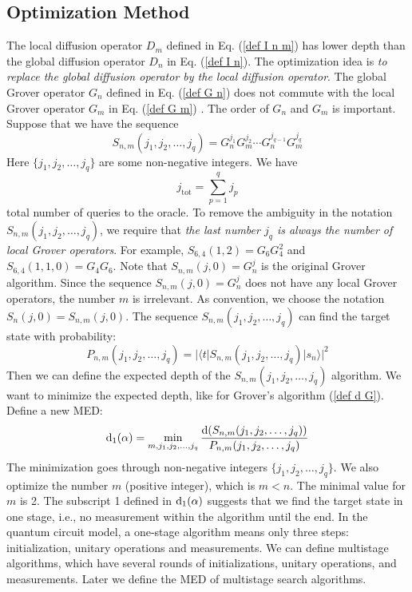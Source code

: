 \documentclass[%
 twocolumn,
 10pt,
 superscriptaddress,
 longbibliography,
 amsmath,amssymb,
 aps,
 pra,
floatfix,
]{revtex4-1}
\newcommand{\eq}{\begin{equation}}
\newcommand{\en}{\end{equation}}
\begin{document}
\subsection{\label{subsec: opt method} Optimization Method}

The local diffusion operator $D_m$ defined in Eq. (\ref{def I n m}) has lower depth than the global diffusion operator $D_n$ in Eq. (\ref{def I n}). The optimization idea is \textit{to replace the global diffusion operator by the local diffusion operator}. The global Grover operator $G_n$ defined in Eq. (\ref{def G n}) does not commute with the local Grover operator $G_m$ in Eq. (\ref{def G m}) \cite{KV06}. The order of $G_n$ and $G_m$ is important. Suppose that we have the sequence
\begin{equation}
	\label{def S n m}
	S_{n,m}(j_1,j_2,\ldots,j_q) = G_n^{j_1}G_m^{j_{2}}\cdots G_n^{j_{q-1}}G_m^{j_q}
\end{equation}
Here $\{j_1,j_2,\ldots,j_q\}$ are some non-negative integers. We have
\begin{equation}
	j_\text{tot} = \sum_{p=1}^q j_{p}
\end{equation}
total number of queries to the oracle. To remove the ambiguity in the notation $S_{n,m}(j_1,j_2,\ldots,j_q)$, we require that \textit{the last number $j_q$ is always the number of local Grover operators}. For example, $S_{6,4}(1,2) = G_6G^2_4$ and $S_{6,4}(1,1,0) = G_4G_6$. Note that $S_{n,m}(j,0)=G^j_n$ is the original Grover algorithm. Since the sequence $S_{n,m}(j,0)=G^j_n$ does not have any local Grover operators, the number $m$ is irrelevant. As convention, we choose the notation $S_{n}(j,0)=S_{n,m}(j,0)$. The sequence $S_{n,m}(j_1,j_2,\ldots,j_q)$ can find the target state with probability:
\eq
P_{n,m}(j_1,j_2,\ldots,j_q) = |\langle t|S_{n,m}(j_1,j_2,\ldots,j_q)|s_n\rangle|^2
\en
Then we can define the expected depth of the $S_{n,m}(j_1,j_2,\ldots,j_q)$ algorithm. We want to minimize the expected depth, like for Grover's algorithm (\ref{def d G}). Define a new MED:
\begin{equation}
	\label{d 1 G}
	{\rm d}_1(\alpha) = \min_{m,j_1,j_2,\ldots,j_q} \frac{{\rm d}(S_{n,m}(j_1,j_2,\ldots,j_q))}{P_{n,m}(j_1,j_2,\ldots,j_q)}
\end{equation}
The minimization goes through non-negative integers $\{j_1,j_2,\ldots,j_q\}$. We also optimize the number $m$ (positive integer), which is $m<n$. The minimal value for $m$ is 2. The subscript 1 defined in $\text d_1(\alpha)$ suggests that we find the target state in one stage, i.e., no measurement within the algorithm until the end. In the quantum circuit model, a one-stage algorithm means only three steps: initialization, unitary operations and measurements. We can define multistage algorithms, which have several rounds of initializations, unitary operations, and measurements. Later we define the MED of multistage search algorithms.
\end{document}
